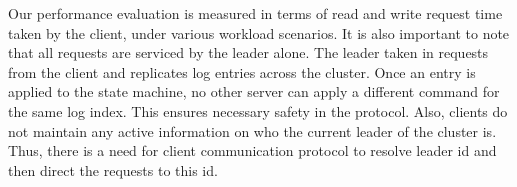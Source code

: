 Our performance evaluation is measured in terms of read and write request time taken by the client, under various workload scenarios. It is also important to note that all requests are serviced by the leader alone. The leader taken in requests from the client and replicates log entries across the cluster. Once an entry is applied to the state machine, no other server can apply a different command for the same log index. This ensures necessary safety in the protocol. Also, clients do not maintain any active information on who the current leader of the cluster is. Thus, there is a need for client communication protocol to resolve leader id and then direct the requests to this id. 
